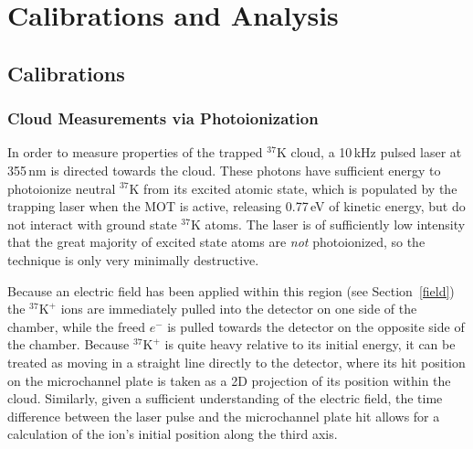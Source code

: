 %
%
%
\clearpage
\chapter{Calibrations and Analysis}




\section{Calibrations}
\label{calibrations_chapter}

\subsection{Cloud Measurements via Photoionization}
\label{cloud}
\label{photoions}
In order to measure properties of the trapped $^{37}\textrm{K}$ cloud, a 10\,kHz pulsed laser at 355\,nm is directed towards the cloud.  These photons have sufficient energy to photoionize neutral $^{37}\textrm{K}$ from its excited atomic state, which is populated by the trapping laser when the MOT is active, releasing 0.77\,eV of kinetic energy, but do not interact with ground state $^{37}\textrm{K}$ atoms.  The laser is of sufficiently low intensity that the great majority of excited state atoms are \emph{not} photoionized, so the technique is only very minimally destructive.  


Because an electric field has been applied within this region (see Section~\ref{field}) the $^{37}\textrm{K}^+$ ions are immediately pulled into the detector on one side of the chamber, while the freed $e^-$ is pulled towards the detector on the opposite side of the chamber.  Because  $^{37}\textrm{K}^+$ is quite heavy relative to its initial energy, it can be treated as moving in a straight line directly to the detector, where its hit position on the microchannel plate is taken as a 2D projection of its position within the cloud.  Similarly, given a sufficient understanding of the electric field, the time difference between the laser pulse and the microchannel plate hit allows for a calculation of the ion's initial position along the third axis.  

